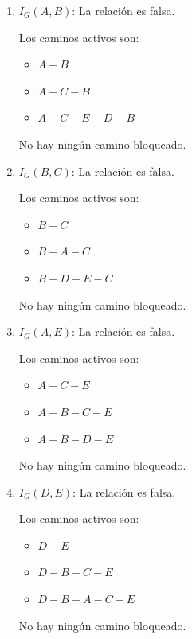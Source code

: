 \documentclass[12pt,a4paper]{article}
\begin{document}
\begin{enumerate}
    \item $I_G(A, B)$: \; La relación es falsa. 
    
    Los caminos activos son:
    \begin{multicols}{2}
        \begin{itemize}
            \item $A-B$
            \item $A-C-B$
            \item $A-C-E-D-B$
        \end{itemize}
    \end{multicols}
    No hay ningún camino bloqueado.
    
    \item $I_G(B, C)$: \; La relación es falsa.
    
    Los caminos activos son:
    \begin{multicols}{2}
        \begin{itemize}
            \item $B-C$
            \item $B-A-C$
            \item $B-D-E-C$
        \end{itemize}
    \end{multicols}
    No hay ningún camino bloqueado.

    \item $I_G(A, E)$: \; La relación es falsa.
    
    Los caminos activos son:
    \begin{multicols}{2}
        \begin{itemize}
            \item $A-C-E$
            \item $A-B-C-E$
            \item $A-B-D-E$
        \end{itemize}
    \end{multicols}
    No hay ningún camino bloqueado.
    
    \item $I_G(D, E)$: \; La relación es falsa.
    
    Los caminos activos son:
    \begin{multicols}{2}
        \begin{itemize}
            \item $D-E$
            \item $D-B-C-E$
            \item $D-B-A-C-E$
        \end{itemize}
    \end{multicols}
    No hay ningún camino bloqueado.


\end{enumerate}
\end{document}
